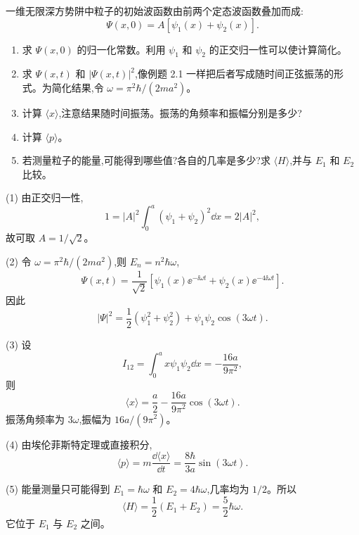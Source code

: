 \begin{question}
一维无限深方势阱中粒子的初始波函数由前两个定态波函数叠加而成:
\[
\Psi(x,0)=A[\psi_1(x)+\psi_2(x)] .
\]
\begin{enumerate}
\item 求 $\Psi(x,0)$ 的归一化常数。利用 $\psi_1$ 和 $\psi_2$ 的正交归一性可以使计算简化。
\item 求 $\Psi(x,t)$ 和 $|\Psi(x,t)|^2$,像例题 2.1 一样把后者写成随时间正弦振荡的形式。为简化结果,令 $\omega=\pi^2\hbar/(2ma^2)$。
\item 计算 $\langle x\rangle$,注意结果随时间振荡。振荡的角频率和振幅分别是多少?
\item 计算 $\langle p\rangle$。
\item 若测量粒子的能量,可能得到哪些值?各自的几率是多少?求 $\langle H\rangle$,并与 $E_1$ 和 $E_2$ 比较。
\end{enumerate}
\begin{solution}
(1) 由正交归一性,
\[
1=|A|^2\int_0^a(\psi_1+\psi_2)^2\dd x=2|A|^2,
\]
故可取 $A=1/\sqrt2$。

(2) 令 $\omega=\pi^2\hbar/(2ma^2)$,则 $E_n=n^2\hbar\omega$,
\[
\Psi(x,t)=\frac1{\sqrt2}\left[\psi_1(x)\ee^{-\ii\omega t}+\psi_2(x)\ee^{-4\ii\omega t}\right].
\]
因此
\[
|\Psi|^2=\frac12(\psi_1^2+\psi_2^2)+\psi_1\psi_2\cos(3\omega t).
\]

(3) 设
\[
I_{12}=\int_0^a x\psi_1\psi_2\dd x=-\frac{16a}{9\pi^2},
\]
则
\[
\langle x\rangle=\frac a2-\frac{16a}{9\pi^2}\cos(3\omega t).
\]
振荡角频率为 $3\omega$,振幅为 $16a/(9\pi^2)$。

(4) 由埃伦菲斯特定理或直接积分,
\[
\langle p\rangle=m\frac{\dd\langle x\rangle}{\dd t}
=\frac{8\hbar}{3a}\sin(3\omega t).
\]

(5) 能量测量只可能得到 $E_1=\hbar\omega$ 和 $E_2=4\hbar\omega$,几率均为 $1/2$。所以
\[
\langle H\rangle=\frac12(E_1+E_2)=\frac52\hbar\omega.
\]
它位于 $E_1$ 与 $E_2$ 之间。
\end{solution}
\end{question}

